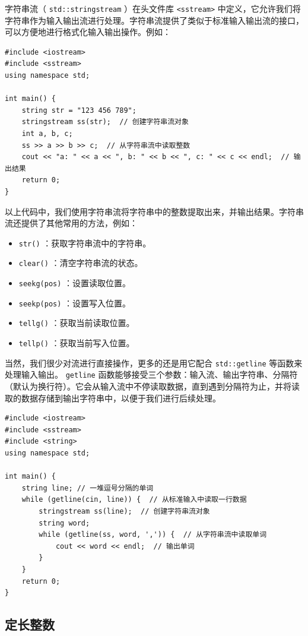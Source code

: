 字符串流（ \texttt{std::stringstream} ）在头文件库 \texttt{<sstream>} 中定义，它允许我们将字符串作为输入输出流进行处理。字符串流提供了类似于标准输入输出流的接口，可以方便地进行格式化输入输出操作。例如：
\begin{verbatim}
#include <iostream>
#include <sstream>
using namespace std;

int main() {
    string str = "123 456 789";
    stringstream ss(str);  // 创建字符串流对象
    int a, b, c;
    ss >> a >> b >> c;  // 从字符串流中读取整数
    cout << "a: " << a << ", b: " << b << ", c: " << c << endl;  // 输出结果
    return 0;
}
\end{verbatim}
以上代码中，我们使用字符串流将字符串中的整数提取出来，并输出结果。字符串流还提供了其他常用的方法，例如：
\begin{itemize}
  \item  \texttt{str()} ：获取字符串流中的字符串。
  \item  \texttt{clear()} ：清空字符串流的状态。
  \item  \texttt{seekg(pos)} ：设置读取位置。
  \item  \texttt{seekp(pos)} ：设置写入位置。
  \item  \texttt{tellg()} ：获取当前读取位置。
  \item  \texttt{tellp()} ：获取当前写入位置。
\end{itemize}
当然，我们很少对流进行直接操作，更多的还是用它配合 \texttt{std::getline} 等函数来处理输入输出。 \texttt{getline} 函数能够接受三个参数：输入流、输出字符串、分隔符（默认为换行符）。它会从输入流中不停读取数据，直到遇到分隔符为止，并将读取的数据存储到输出字符串中，以便于我们进行后续处理。
\begin{verbatim}
#include <iostream>
#include <sstream>
#include <string>
using namespace std;

int main() {
    string line; // 一堆逗号分隔的单词
    while (getline(cin, line)) {  // 从标准输入中读取一行数据
        stringstream ss(line);  // 创建字符串流对象
        string word;
        while (getline(ss, word, ',')) {  // 从字符串流中读取单词
            cout << word << endl;  // 输出单词
        }
    }
    return 0;
}
\end{verbatim}

\subsection{定长整数}

